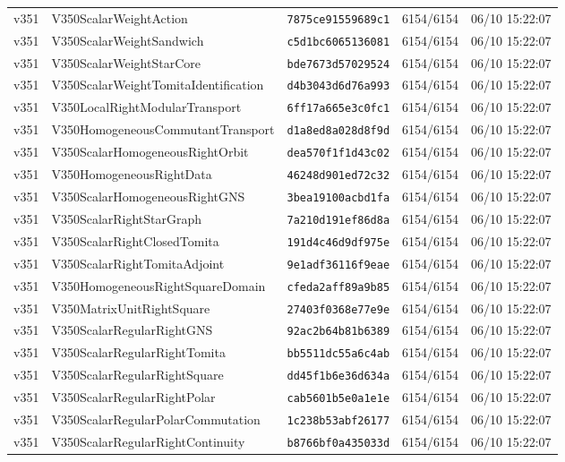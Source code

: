 \documentclass[11pt]{article}
\theoremstyle{definition}\newtheorem{deriv}{Derivação}
\begin{document}
{\begin{longtable}{@{}lllll@{}}
v351 & V350ScalarWeightAction & \texttt{7875ce91559689c1} & 6154/6154 & 06/10 15:22:07 \\
v351 & V350ScalarWeightSandwich & \texttt{c5d1bc6065136081} & 6154/6154 & 06/10 15:22:07 \\
v351 & V350ScalarWeightStarCore & \texttt{bde7673d57029524} & 6154/6154 & 06/10 15:22:07 \\
v351 & V350ScalarWeightTomitaIdentification & \texttt{d4b3043d6d76a993} & 6154/6154 & 06/10 15:22:07 \\
v351 & V350LocalRightModularTransport & \texttt{6ff17a665e3c0fc1} & 6154/6154 & 06/10 15:22:07 \\
v351 & V350HomogeneousCommutantTransport & \texttt{d1a8ed8a028d8f9d} & 6154/6154 & 06/10 15:22:07 \\
v351 & V350ScalarHomogeneousRightOrbit & \texttt{dea570f1f1d43c02} & 6154/6154 & 06/10 15:22:07 \\
v351 & V350HomogeneousRightData & \texttt{46248d901ed72c32} & 6154/6154 & 06/10 15:22:07 \\
v351 & V350ScalarHomogeneousRightGNS & \texttt{3bea19100acbd1fa} & 6154/6154 & 06/10 15:22:07 \\
v351 & V350ScalarRightStarGraph & \texttt{7a210d191ef86d8a} & 6154/6154 & 06/10 15:22:07 \\
v351 & V350ScalarRightClosedTomita & \texttt{191d4c46d9df975e} & 6154/6154 & 06/10 15:22:07 \\
v351 & V350ScalarRightTomitaAdjoint & \texttt{9e1adf36116f9eae} & 6154/6154 & 06/10 15:22:07 \\
v351 & V350HomogeneousRightSquareDomain & \texttt{cfeda2aff89a9b85} & 6154/6154 & 06/10 15:22:07 \\
v351 & V350MatrixUnitRightSquare & \texttt{27403f0368e77e9e} & 6154/6154 & 06/10 15:22:07 \\
v351 & V350ScalarRegularRightGNS & \texttt{92ac2b64b81b6389} & 6154/6154 & 06/10 15:22:07 \\
v351 & V350ScalarRegularRightTomita & \texttt{bb5511dc55a6c4ab} & 6154/6154 & 06/10 15:22:07 \\
v351 & V350ScalarRegularRightSquare & \texttt{dd45f1b6e36d634a} & 6154/6154 & 06/10 15:22:07 \\
v351 & V350ScalarRegularRightPolar & \texttt{cab5601b5e0a1e1e} & 6154/6154 & 06/10 15:22:07 \\
v351 & V350ScalarRegularPolarCommutation & \texttt{1c238b53abf26177} & 6154/6154 & 06/10 15:22:07 \\
v351 & V350ScalarRegularRightContinuity & \texttt{b8766bf0a435033d} & 6154/6154 & 06/10 15:22:07 \\

\end{longtable}}
\end{document}
